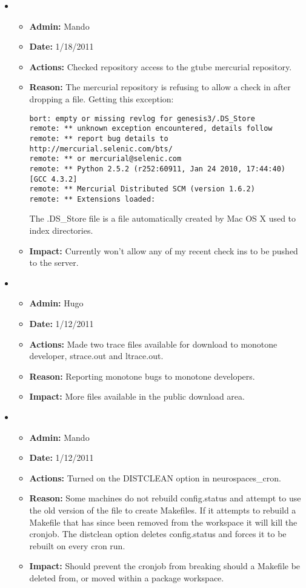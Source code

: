 \documentclass[12pt]{article}
\begin{document}
\begin{itemize}
\item
\begin{itemize}
\item[] {\bf Admin:} Mando
\item[] {\bf Date:} 1/18/2011 
\item[] {\bf Actions:} Checked repository access to the gtube mercurial repository.
\item[] {\bf Reason:} The mercurial repository is refusing to allow a check in after dropping a file. Getting this exception:

\begin{verbatim}
bort: empty or missing revlog for genesis3/.DS_Store
remote: ** unknown exception encountered, details follow
remote: ** report bug details to http://mercurial.selenic.com/bts/
remote: ** or mercurial@selenic.com
remote: ** Python 2.5.2 (r252:60911, Jan 24 2010, 17:44:40) [GCC 4.3.2]
remote: ** Mercurial Distributed SCM (version 1.6.2)
remote: ** Extensions loaded: 

\end{verbatim} 

The .DS\_Store file is a file automatically created by Mac OS X used to index directories.  

\item[] {\bf Impact:} Currently won't allow any of my recent check ins to be pushed to the server. 
\end{itemize}

\item
\begin{itemize}
\item[] {\bf Admin:} Hugo
\item[] {\bf Date:} 1/12/2011 
\item[] {\bf Actions:} Made two trace files available for download to monotone developer, strace.out and ltrace.out.
\item[] {\bf Reason:} Reporting monotone bugs to monotone developers.
\item[] {\bf Impact:} More files available in the public download area.
\end{itemize}

\item
\begin{itemize}
\item[] {\bf Admin:} Mando
\item[] {\bf Date:} 1/12/2011 
\item[] {\bf Actions:} Turned on the DISTCLEAN option in neurospaces\_cron.
\item[] {\bf Reason:} Some machines do not rebuild config.status and attempt to use the old version of the file to create Makefiles. If it attempts to rebuild a Makefile that has since been removed from the workspace it will kill the cronjob. The distclean option deletes config.status and forces it to be rebuilt on every cron run. 
\item[] {\bf Impact:} Should prevent the cronjob from breaking should a Makefile be deleted from, or moved within a package workspace.
\end{itemize}


\end{itemize}
\end{document}
